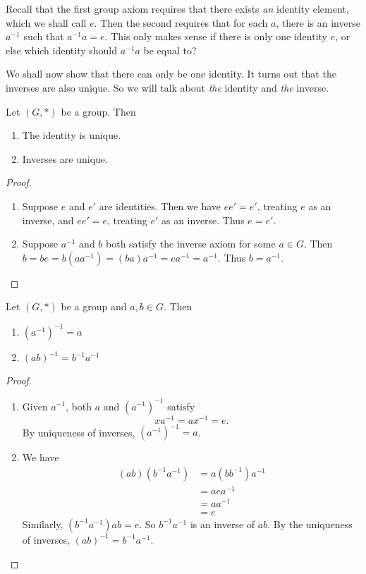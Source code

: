 \documentclass[a4paper]{article}
\begin{document}
Recall that the first group axiom requires that there exists \emph{an} identity element, which we shall call $e$. Then the second requires that for each $a$, there is an inverse $a^{-1}$ such that $a^{-1}a = e$. This only makes sense if there is only one identity $e$, or else which identity should $a^{-1}a$ be equal to?

We shall now show that there can only be one identity. It turns out that the inverses are also unique. So we will talk about \emph{the} identity and \emph{the} inverse.
\begin{prop}
  Let $(G, *)$ be a group. Then
  \begin{enumerate}
    \item The identity is unique.
    \item Inverses are unique.
  \end{enumerate}
\end{prop}
\begin{proof}\leavevmode
  \begin{enumerate}[label=(\roman{*})]
    \item Suppose $e$ and $e'$ are identities. Then we have $ee' = e'$, treating $e$ as an inverse, and $ee' = e$, treating $e'$ as an inverse. Thus $e = e'$.
    \item Suppose $a^{-1}$ and $b$ both satisfy the inverse axiom for some $a\in G$. Then $b = be = b(aa^{-1}) = (ba)a^{-1} = ea^{-1} = a^{-1}$. Thus $b = a^{-1}$.\qedhere
  \end{enumerate}
\end{proof}
\begin{prop}
  Let $(G, *)$ be a group and $a, b\in G$. Then
  \begin{enumerate}
    \item $(a^{-1})^{-1} = a$
    \item $(ab)^{-1} = b^{-1}a^{-1}$
  \end{enumerate}
\end{prop}
\begin{proof}\leavevmode
  \begin{enumerate}
    \item Given $a^{-1}$, both $a$ and $(a^{-1})^{-1}$ satisfy
      \[
        xa^{-1} = ax^{-1} = e.
      \]
      By uniqueness of inverses, $(a^{-1})^{-1} = a$.
    \item We have
      \begin{align*}
        (ab)(b^{-1}a^{-1}) &= a(bb^{-1})a^{-1} \\
        &= aea^{-1}\\
        &= aa^{-1}\\
        &= e
      \end{align*}
      Similarly, $(b^{-1}a^{-1})ab = e$. So $b^{-1}a^{-1}$ is an inverse of $ab$. By the uniqueness of inverses, $(ab)^{-1} = b^{-1}a^{-1}$.\qedhere
  \end{enumerate}
\end{proof}
\end{document}

